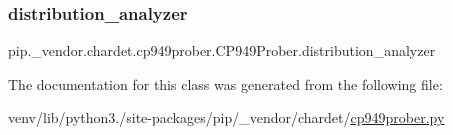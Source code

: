 \subsubsection{\texorpdfstring{distribution\+\_\+analyzer}{distribution\_analyzer}}
{\footnotesize\ttfamily pip.\+\_\+vendor.\+chardet.\+cp949prober.\+C\+P949\+Prober.\+distribution\+\_\+analyzer}



The documentation for this class was generated from the following file\+:\begin{DoxyCompactItemize}
\item 
venv/lib/python3./site-\/packages/pip/\+\_\+vendor/chardet/\hyperlink{cp949prober_8py}{cp949prober.\+py}\end{DoxyCompactItemize}
